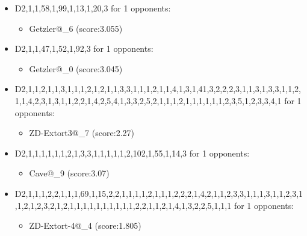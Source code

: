 \begin{appendices}
\begin{itemize}
        \item D2,1,1,58,1,99,1,13,1,20,3 for 1 opponents:
        \begin{multicols}{3}
            \begin{itemize}
                \item Getzler@\_6 (score:3.055)
            \end{itemize}
        \end{multicols}

        \item D2,1,1,47,1,52,1,92,3 for 1 opponents:
        \begin{multicols}{3}
            \begin{itemize}
                \item Getzler@\_0 (score:3.045)
            \end{itemize}
        \end{multicols}

        \item D2,1,1,2,1,1,3,1,1,1,2,1,2,1,1,3,3,1,1,1,2,1,1,4,1,3,1,41,3,2,2,2,3,1,1,3,1,3,3,1,1,2,1,1,4,2,3,1,3,1,1,2,2,1,4,2,5,4,1,3,3,2,5,2,1,1,1,2,1,1,1,1,1,1,2,3,5,1,2,3,3,4,1 for 1 opponents:
        \begin{multicols}{3}
            \begin{itemize}
                \item ZD-Extort3@\_7 (score:2.27)
            \end{itemize}
        \end{multicols}

        \item D2,1,1,1,1,1,1,2,1,3,3,1,1,1,1,1,2,102,1,55,1,14,3 for 1 opponents:
        \begin{multicols}{3}
            \begin{itemize}
                \item Cave@\_9 (score:3.07)
            \end{itemize}
        \end{multicols}

        \item D2,1,1,1,2,2,1,1,1,69,1,15,2,2,1,1,1,1,2,1,1,1,2,2,2,1,4,2,1,1,2,3,3,1,1,1,3,1,1,2,3,1,1,2,1,2,3,2,1,2,1,1,1,1,1,1,1,1,1,1,2,2,1,1,2,1,4,1,3,2,2,5,1,1,1 for 1 opponents:
        \begin{multicols}{3}
            \begin{itemize}
                \item ZD-Extort-4@\_4 (score:1.805)
            \end{itemize}
        \end{multicols}


\end{itemize}
\end{appendices}
